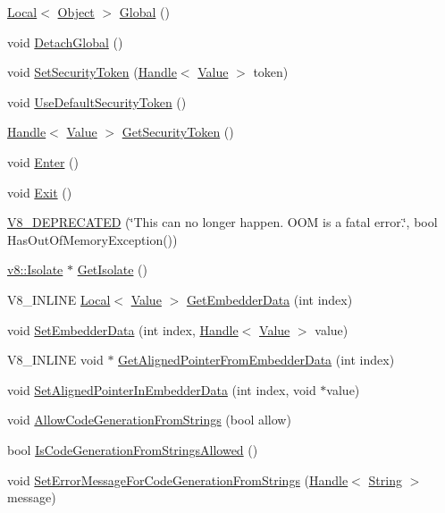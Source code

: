 \begin{DoxyCompactItemize}
\item 
\hyperlink{classv8_1_1Local}{Local}$<$ \hyperlink{classv8_1_1Object}{Object} $>$ \hyperlink{classv8_1_1Context_af5cd9f97ef6a3307c1c21f80f4b743eb}{Global} ()
\item 
void \hyperlink{classv8_1_1Context_a841c7dd92eb8c57df92a268a164dea97}{Detach\-Global} ()
\item 
void \hyperlink{classv8_1_1Context_a288d8549547f6bdf4312f5333f60f24d}{Set\-Security\-Token} (\hyperlink{classv8_1_1Handle}{Handle}$<$ \hyperlink{classv8_1_1Value}{Value} $>$ token)
\item 
void \hyperlink{classv8_1_1Context_aa9e1a14982b64fd51ab87600a287bad2}{Use\-Default\-Security\-Token} ()
\item 
\hyperlink{classv8_1_1Handle}{Handle}$<$ \hyperlink{classv8_1_1Value}{Value} $>$ \hyperlink{classv8_1_1Context_a8e71e658633518ca7718c0f6e938c6a9}{Get\-Security\-Token} ()
\item 
void \hyperlink{classv8_1_1Context_a6995c49d9897eb49053f07874b825133}{Enter} ()
\item 
void \hyperlink{classv8_1_1Context_a2db09d4fefb26023a40d88972a4c1599}{Exit} ()
\item 
\hyperlink{classv8_1_1Context_a6a4ca53837ec39c684cdbfc73ab44e4e}{V8\-\_\-\-D\-E\-P\-R\-E\-C\-A\-T\-E\-D} (\char`\"{}This can no longer happen. O\-O\-M is a fatal error.\char`\"{}, bool Has\-Out\-Of\-Memory\-Exception())
\item 
\hyperlink{classv8_1_1Isolate}{v8\-::\-Isolate} $\ast$ \hyperlink{classv8_1_1Context_af55552d8658ecb20eff7af2c83e8ede2}{Get\-Isolate} ()
\item 
V8\-\_\-\-I\-N\-L\-I\-N\-E \hyperlink{classv8_1_1Local}{Local}$<$ \hyperlink{classv8_1_1Value}{Value} $>$ \hyperlink{classv8_1_1Context_a9cfafe0ac56f6aee17eb80a913489296}{Get\-Embedder\-Data} (int index)
\item 
void \hyperlink{classv8_1_1Context_ae18e007074770872e78e0040f36de8c6}{Set\-Embedder\-Data} (int index, \hyperlink{classv8_1_1Handle}{Handle}$<$ \hyperlink{classv8_1_1Value}{Value} $>$ value)
\item 
V8\-\_\-\-I\-N\-L\-I\-N\-E void $\ast$ \hyperlink{classv8_1_1Context_aa3b5c1a1a5d145c6096840898013f559}{Get\-Aligned\-Pointer\-From\-Embedder\-Data} (int index)
\item 
void \hyperlink{classv8_1_1Context_a522063c88e4c2832f5ff4f3980815f58}{Set\-Aligned\-Pointer\-In\-Embedder\-Data} (int index, void $\ast$value)
\item 
void \hyperlink{classv8_1_1Context_a794ccc42113566f5d363f89c8b0d3c2c}{Allow\-Code\-Generation\-From\-Strings} (bool allow)
\item 
bool \hyperlink{classv8_1_1Context_aa7a960a232d232d1a2a904c2e6c18831}{Is\-Code\-Generation\-From\-Strings\-Allowed} ()
\item 
void \hyperlink{classv8_1_1Context_a6a8d067b246b8792b19e8075bc410f1d}{Set\-Error\-Message\-For\-Code\-Generation\-From\-Strings} (\hyperlink{classv8_1_1Handle}{Handle}$<$ \hyperlink{classv8_1_1String}{String} $>$ message)
\end{DoxyCompactItemize}
